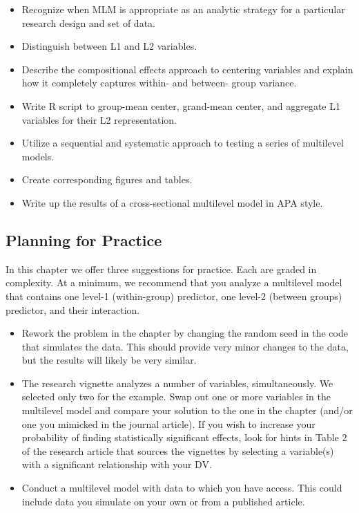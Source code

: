 \documentclass[
  11pt,
]{book}
\providecommand{\tightlist}{%
  \setlength{\itemsep}{0pt}\setlength{\parskip}{0pt}}
\begin{document}
\begin{itemize}
\tightlist
\item
  Recognize when MLM is appropriate as an analytic strategy for a particular research design and set of data.
\item
  Distinguish between L1 and L2 variables.
\item
  Describe the compositional effects approach to centering variables and explain how it completely captures within- and between- group variance.
\item
  Write R script to group-mean center, grand-mean center, and aggregate L1 variables for their L2 representation.
\item
  Utilize a sequential and systematic approach to testing a series of multilevel models.
\item
  Create corresponding figures and tables.
\item
  Write up the results of a cross-sectional multilevel model in APA style.
\end{itemize}

\hypertarget{planning-for-practice}{%
\subsection{Planning for Practice}\label{planning-for-practice}}

In this chapter we offer three suggestions for practice. Each are graded in complexity. At a minimum, we recommend that you analyze a multilevel model that contains one level-1 (within-group) predictor, one level-2 (between groups) predictor, and their interaction.

\begin{itemize}
\tightlist
\item
  Rework the problem in the chapter by changing the random seed in the code that simulates the data. This should provide very minor changes to the data, but the results will likely be very similar.
\item
  The research vignette analyzes a number of variables, simultaneously. We selected only two for the example. Swap out one or more variables in the multilevel model and compare your solution to the one in the chapter (and/or one you mimicked in the journal article). If you wish to increase your probability of finding statistically significant effects, look for hints in Table 2 of the \citep{lefevor_homonegativity_2020} research article that sources the vignettes by selecting a variable(s) with a significant relationship with your DV.
\item
  Conduct a multilevel model with data to which you have access. This could include data you simulate on your own or from a published article.
\end{itemize}
\end{document}
